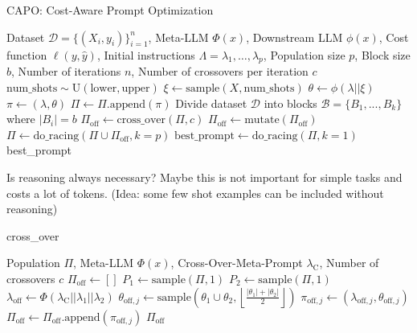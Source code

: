 \documentclass{article}
\begin{document}
\begin{algorithm}[h]
    \caption{CAPO: Cost-Aware Prompt Optimization}
    \begin{algorithmic}[1]
        \Require Dataset $\mathcal{D} = \{(X_i, y_i)\}_{i=1}^n$, Meta-LLM $\Phi(x)$,
        Downstream LLM $\phi(x)$, Cost function $\ell(y, \hat{y})$,
        Initial instructions $\Lambda = {\lambda_1, \dots, \lambda_p}$,
        Population size $p$, Block size $b$, Number of iterations $n$, Number of crossovers per iteration $c$
        \For{$\lambda \in \Lambda$}
        \State $\text{num\_shots} \sim \text{U}(\text{lower}, \text{upper})$
        \State $\xi \gets \text{sample}(X, \text{num\_shots})$ 
        \State $\theta \gets \phi(\lambda||\xi)$   
        \State $\pi \gets (\lambda, \theta)$
        \State $\Pi \gets \Pi\text{.append}(\pi)$
        \EndFor
        \State Divide dataset $\mathcal{D}$ into blocks $\mathcal{B} = \{B_1, ..., B_k\}$ where $|B_i| = b$
        \State $\Pi_{\text{off}} \gets \text{cross\_over}(\Pi, c)$
        \State $\Pi_{\text{off}} \gets \text{mutate}(\Pi_{\text{off}})$
        \State $\Pi \gets \text{do\_racing}(\Pi \cup \Pi_\text{off}, k=p)$
        \EndFor
        \State $\text{best\_prompt} \gets \text{do\_racing}(\Pi, k=1)$
        \State \Return best\_prompt
    \end{algorithmic}
\end{algorithm}

\noindent Is reasoning always necessary? Maybe this is not important for simple tasks and costs a lot of tokens. (Idea: some few shot examples can be included without reasoning)

\begin{algorithm}[h]
    \caption{cross\_over}
    \begin{algorithmic}[1]
        \Require Population $\Pi$, Meta-LLM $\Phi(x)$, Cross-Over-Meta-Prompt $\lambda_{\text{C}}$, Number of crossovers $c$
        \State $\Pi_{\text{off}} \gets  []$
        \State $P_1 \gets \text{sample}(\Pi, 1)$ 
        \State $P_2 \gets \text{sample}(\Pi, 1)$ 
        \State $\lambda_{\text{off}} \gets \Phi(\lambda_{\text{C}} || \lambda_1 || \lambda_2)$ 
        \State $\theta_{\text{off},j} \gets \text{sample}(\theta_1 \cup \theta_2, \left\lfloor\frac{|\theta_1|+|\theta_2|}{2}\right\rfloor)$ 
        \State $\pi_{\text{off},j} \gets (\lambda_{\text{off},j}, \theta_{\text{off},j})$
        \State $\Pi_{\text{off}} \gets \Pi_{\text{off}}.\text{append}(\pi_{\text{off},j})$
        \EndFor
        \State \Return $\Pi_{\text{off}}$
    \end{algorithmic}
\end{algorithm}
\end{document}
